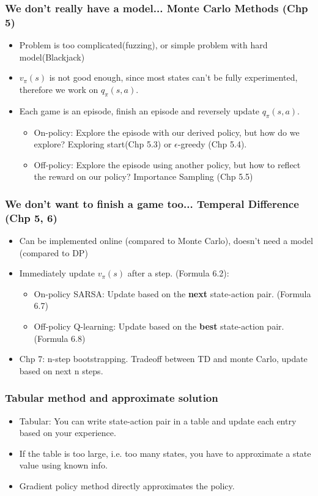 \begin{frame}
    \frametitle{We don't really have a model... Monte Carlo Methods (Chp 5)}
    \begin{itemize}
        \item Problem is too complicated(fuzzing), or simple problem with hard model(Blackjack)
        \item $v_\pi(s)$ is not good enough, since most states can't be fully experimented, therefore we work on $q_\pi(s, a)$.
        \item Each game is an episode, finish an episode and reversely update $q_\pi(s, a)$.
              \begin{itemize}
                  \item On-policy: Explore the episode with our derived policy, but how do we explore? Exploring start(Chp 5.3) or $\epsilon$-greedy (Chp 5.4).
                  \item Off-policy: Explore the episode using another policy, but how to reflect the reward on our policy? Importance Sampling (Chp 5.5)
              \end{itemize}
    \end{itemize}
\end{frame}

\begin{frame}
    \frametitle{We don't want to finish a game too... Temperal Difference (Chp 5, 6)}
    \begin{itemize}
        \item Can be implemented online (compared to Monte Carlo), doesn't need a model (compared to DP)
        \item Immediately update $v_\pi(s)$ after a step. (Formula 6.2):
              \begin{itemize}
                  \item On-policy SARSA: Update based on the \textbf{next} state-action pair. (Formula 6.7)
                  \item Off-policy Q-learning: Update based on the \textbf{best} state-action pair. (Formula 6.8)
              \end{itemize}
        \item Chp 7: n-step bootstrapping. Tradeoff between TD and monte Carlo, update based on next n steps.
    \end{itemize}
\end{frame}

\begin{frame}
    \frametitle{Tabular method and approximate solution}
    \begin{itemize}
        \item Tabular: You can write state-action pair in a table and update each entry based on your experience.
        \item If the table is too large, i.e. too many states, you have to approximate a state value using known info.
        \item Gradient policy method directly approximates the policy.
    \end{itemize}
\end{frame}

